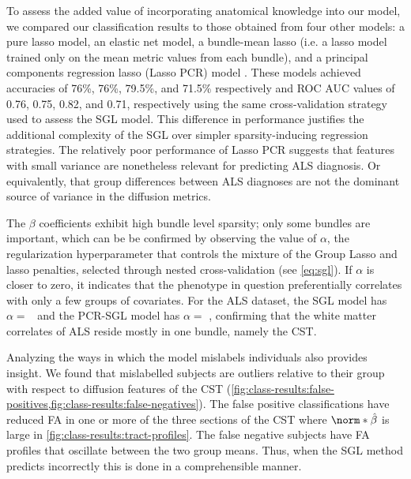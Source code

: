 \documentclass[10pt,letterpaper]{article}
\begin{document}
To assess the added value of incorporating anatomical knowledge into our
model, we compared our classification results to those obtained from
four other models: a pure lasso model, an elastic net model, a bundle-mean lasso (i.e. a lasso model trained only on the mean metric values from each bundle), and a principal components regression lasso (Lasso PCR) model \cite{powell2018local, rasero2021integrating}.
These models achieved accuracies of 76\%, 76\%, 79.5\%, and 71.5\% respectively and ROC AUC values of 0.76, 0.75, 0.82, and 0.71, respectively
using the same cross-validation strategy used to assess the SGL model.
This difference in performance justifies the additional complexity of the SGL
over simpler sparsity-inducing regression strategies.
The relatively poor performance of Lasso PCR suggests that features with small variance are nonetheless relevant for predicting ALS diagnosis. Or equivalently, that group differences between ALS diagnoses are not the dominant source of variance in the diffusion metrics.

The $\beta$ coefficients exhibit high bundle level sparsity; only some
bundles are important, which can be be confirmed by observing the value of
$\alpha$, the regularization hyperparameter that controls the mixture of the
Group Lasso and lasso penalties, selected through nested cross-validation
(see \cref{eq:sgl}).
If $\alpha$ is closer to zero, it indicates that the phenotype in question
preferentially correlates with only a few groups of covariates. For the ALS
dataset, the SGL model has $\alpha = $ \alsLRatio
~and the PCR-SGL model has \protect$\alpha = $ \protect\alsLRatioGpca,
confirming that the white matter correlates of ALS reside mostly in one
bundle, namely the CST.

Analyzing the ways in which the model mislabels individuals also provides
insight. We found that mislabelled subjects are outliers relative to their
group with respect to diffusion features of the CST
(\cref{fig:class-results:false-positives,fig:class-results:false-negatives}).
The false positive classifications have reduced FA in one or more of the
three sections of the CST where $\norm*{\hat{\beta}}$ is large in
\cref{fig:class-results:tract-profiles}. The false negative subjects have FA
profiles that oscillate between the two group means. Thus, when the SGL
method predicts incorrectly this is done in a comprehensible manner.
\end{document}
